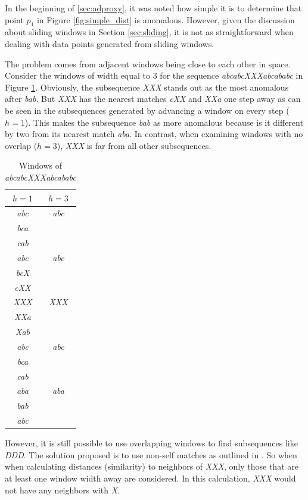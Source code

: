In the beginning of \ref{sec:adproxy}, it was noted how simple it is to determine that point $p_1$ in Figure \ref{fig:simple_dist} is anomalous. However, given the discussion about sliding windows in Section \ref{sec:sliding}, it is not as straightforward when dealing with data points generated from sliding windows.

The problem comes from adjacent windows being close to each other in space. Consider the windows of width equal to 3 for the sequence \emph{abcabcXXXabcababc} \cite{Keogh2005} in Figure \ref{tbl:selfmatch}. Obviously, the subsequence \emph{XXX} stands out as the most anomalous after \emph{bab}. But \emph{XXX} has the nearest matches \emph{cXX} and \emph{XXa} one step away as can be seen in the subsequences generated by advancing a window on every step ($h=1$). This makes the subsequence \emph{bab} as more anomalous because is it different by two from its nearest match \emph{aba}. In contrast, when examining windows with no overlap ($h=3$), \emph{XXX} is far from all other subsequences.

\begin{table}[h]
  \centering
  \begin{tabular}{|c|c|}
    \hline
    $h=1$ & $h=3$ \\
    \hline
    \hline
    \emph{abc} & \emph{abc} \\
    \emph{bca} & \\
    \emph{cab} & \\
    \hline
    \emph{abc} & \emph{abc} \\
    \emph{bcX} & \\
    \emph{cXX} & \\
    \hline
    \emph{XXX} & \emph{XXX} \\
    \emph{XXa} & \\
    \emph{Xab} & \\
    \hline
    \emph{abc} & \emph{abc} \\
    \emph{bca} & \\
    \emph{cab} & \\
    \hline
    \emph{aba} & \emph{aba} \\ 
    \emph{bab} & \\
    \emph{abc} & \\
    \hline
  \end{tabular}
  \caption{Windows of \emph{abcabcXXXabcababc}}
  \label{tbl:selfmatch}
\end{table}

However, it is still possible to use overlapping windows to find subsequences like \emph{DDD}. The solution proposed is to use non-self matches as outlined in \cite{Keogh2005}. So when when calculating distances (similarity) to neighbors of \emph{XXX}, only those that are at least one window width away are considered. In this calculation, \emph{XXX} would not have any neighbors with \emph{X}.

